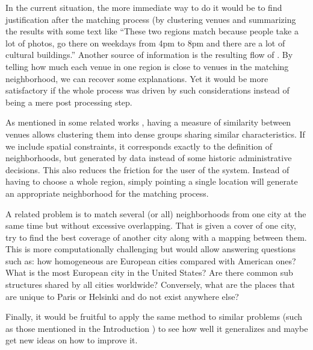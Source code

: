 In the current situation, the more immediate way to do it would be to find
justification after the matching process (by clustering venues and summarizing
the results with some text like \enquote{These two regions match because people
take a lot of photos, go there on weekdays from 4pm to 8pm and there are a
lot of cultural buildings.} Another source of information is the resulting
flow of \emd{}. By telling how much each venue in one region is close to venues
in the matching neighborhood, we can recover some explanations.  Yet it would
be more satisfactory if the whole process was driven by such considerations
instead of being a mere post processing step.

\medskip

As mentioned in some related works \autocites{Livehoods12}{Hoodsquare13},
having a measure of similarity between venues allows clustering them into
dense groups sharing similar characteristics. If we include spatial
constraints, it corresponds exactly to the definition of neighborhoods, but
generated by data instead of some historic administrative decisions. This
also reduces the friction for the user of the system. Instead of having to
choose a whole region, simply pointing a single location will generate an
appropriate neighborhood for the matching process.

A related problem is to match several (or all) neighborhoods from one city at
the same time but without excessive overlapping. That is given a cover of one
city, try to find the best coverage of another city along with a mapping
between them.  This is more computationally challenging but would allow
answering questions such as: how homogeneous are European cities compared with
American ones? What is the most European city in the United States? Are there
common sub structures shared by all cities worldwide? Conversely, what are the
places that are unique to Paris or Helsinki and do not exist anywhere else?

Finally, it would be fruitful to apply the same method to similar problems
(such as those mentioned in the Introduction ) to see
how well it generalizes and maybe get new ideas on how to improve it.

\endgroup
